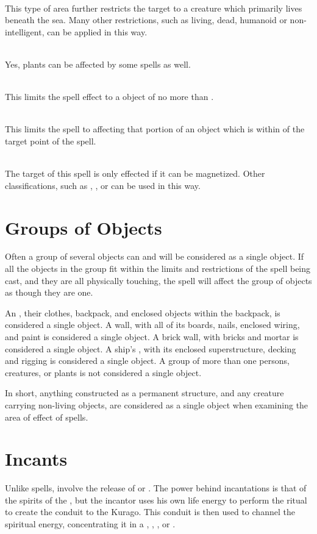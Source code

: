 \begin{multicols}{2}
\\
This type of area further restricts the target to a creature which primarily lives beneath the sea. Many other restrictions, such as living, dead, humanoid or non-intelligent, can be applied in this way.

\\
Yes, plants can be affected by some spells as well.

\\
This limits the spell effect to a  object of no more than .

\\
This limits the spell to affecting that portion of an object which is within  of the target point of the spell.

\\
The target of this spell is only effected if it can be magnetized. Other classifications, such as , ,  or  can be used in this way.
\section{Groups of Objects}
Often a group of several objects can and will be considered as a single object. If all the objects in the group fit within the limits and restrictions of the spell being cast, and they are all physically touching, the spell will affect the group of objects as though they are one. 

An , their clothes, backpack, and enclosed objects within the backpack, is considered a single object. A wall, with all of its boards, nails, enclosed wiring, and paint is considered a single object. A brick wall, with bricks and mortar is considered a single object. A ship's , with its enclosed superstructure, decking and rigging is considered a single object. A group of more than one persons, creatures, or plants is not considered a single object.

In short, anything constructed as a permanent structure, and any creature carrying non-living objects, are considered as a single object when examining the area of effect of spells.
\section{Incants}
Unlike spells,  involve the release of  or . The power behind incantations is that of the spirits of the , but the incantor uses his own life energy to perform the ritual to create the conduit to the Kurago. This conduit is then used to channel the spiritual energy, concentrating it in a , , ,  or . 


\end{multicols}
